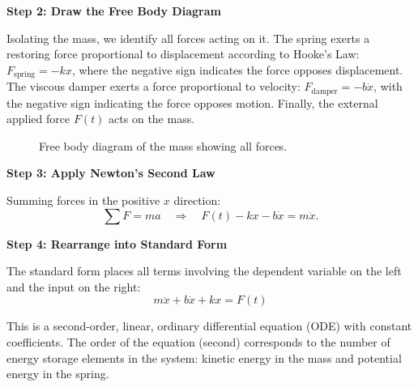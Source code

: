 \textbf{Step 2: Draw the Free Body Diagram}

Isolating the mass, we identify all forces acting on it. The spring exerts a restoring force proportional to displacement according to Hooke's Law: $F_{\text{spring}} = -kx$, where the negative sign indicates the force opposes displacement. The viscous damper exerts a force proportional to velocity: $F_{\text{damper}} = -b\dot{x}$, with the negative sign indicating the force opposes motion. Finally, the external applied force $F(t)$ acts on the mass.

\begin{figure}[htbp]
\centering
{}
\caption{Free body diagram of the mass showing all forces.}
\label{fig:fbd}
\end{figure}

\textbf{Step 3: Apply Newton's Second Law}

Summing forces in the positive $x$ direction:
\begin{equation}
\sum F = ma \quad \Rightarrow \quad F(t) - kx - b\dot{x} = m\ddot{x}.
\end{equation}

\textbf{Step 4: Rearrange into Standard Form}

The standard form places all terms involving the dependent variable on the left and the input on the right:
\begin{equation}
\boxed{m\ddot{x} + b\dot{x} + kx = F(t)}
\label{eq:msd_ode}
\end{equation}

This is a second-order, linear, ordinary differential equation (ODE) with constant coefficients. The order of the equation (second) corresponds to the number of energy storage elements in the system: kinetic energy in the mass and potential energy in the spring.

